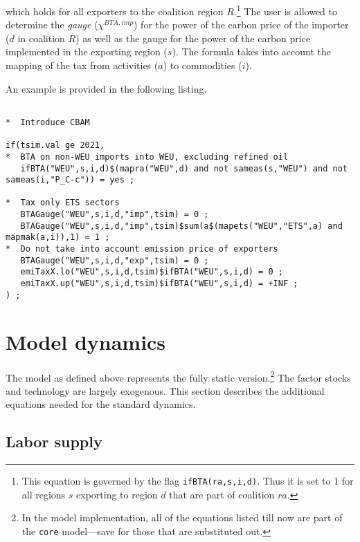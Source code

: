 \documentclass[11pt,letterpaper]{report}
\begin{document}
\noindent which holds for all exporters
to the coalition region $R$.\footnote{This
equation is governed by the flag \texttt{ifBTA(ra,s,i,d)}.
Thus it is set to 1 for all regions $s$ exporting
to region $d$ that are part of coalition $\mathit{ra}$.} The user is allowed to
determine the \emph{gauge} ($\chi^{\mathit{BTA},\mathit{imp}}$) for the power
of the carbon price of the importer ($d$ in
coalition $R$) as well as the
gauge for the power of the carbon
price implemented in the exporting
region ($s$). The formula takes into
account the mapping of the tax from
activities ($a$) to commodities ($i$).

An example is provided in the following listing.

\begin{lstlisting}[language=GAMS,
	caption={Border tax adjustment based on the
	carbon content of the exporter}, label=lst:BTA2]

*  Introduce CBAM

if(tsim.val ge 2021,
*  BTA on non-WEU imports into WEU, excluding refined oil
   ifBTA("WEU",s,i,d)$(mapra("WEU",d) and not sameas(s,"WEU") and not sameas(i,"P_C-c")) = yes ;

*  Tax only ETS sectors
   BTAGauge("WEU",s,i,d,"imp",tsim) = 0 ;
   BTAGauge("WEU",s,i,d,"imp",tsim)$sum(a$(mapets("WEU","ETS",a) and mapmak(a,i)),1) = 1 ;
*  Do not take into account emission price of exporters
   BTAGauge("WEU",s,i,d,"exp",tsim) = 0 ;
   emiTaxX.lo("WEU",s,i,d,tsim)$ifBTA("WEU",s,i,d) = 0 ;
   emiTaxX.up("WEU",s,i,d,tsim)$ifBTA("WEU",s,i,d) = +INF ;
) ;

\end{lstlisting}

\chapter{Model dynamics}
\renewcommand{\theequation}{{G-}\arabic{equation}}
\setcounter{equation}{0}

The model as defined above represents the fully static version.\footnote{In the
model implementation, all of the equations listed till now are part of the
\texttt{core} model---save for those that are substituted out.} The factor
stocks and technology are largely exogenous. This section describes the
additional equations needed for the standard dynamics.

\section{Labor supply}
\end{document}
